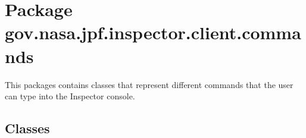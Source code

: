 \hypertarget{namespacegov_1_1nasa_1_1jpf_1_1inspector_1_1client_1_1commands}{}\section{Package gov.\+nasa.\+jpf.\+inspector.\+client.\+commands}
\label{namespacegov_1_1nasa_1_1jpf_1_1inspector_1_1client_1_1commands}


This packages contains classes that represent different commands that the user can type into the Inspector console.  


\subsection*{Classes}
